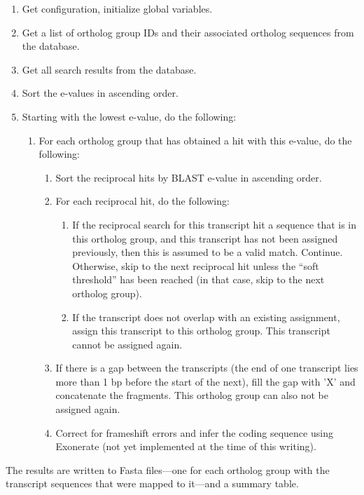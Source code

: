 \begin{enumerate}
	\item Get configuration, initialize global variables.
	\item Get a list of ortholog group IDs and their associated ortholog sequences
		from the database.
	\item Get all search results from the database.
	\item Sort the  e-values in ascending order.
	\item Starting with the lowest  e-value, do the following:
	\begin{enumerate}
		\item For each ortholog group that has obtained a  hit with this
			e-value, do the following:
			\begin{enumerate}
				\item Sort the reciprocal hits by BLAST e-value in ascending order.
				\item For each reciprocal hit, do the following:
				\begin{enumerate}
					\item If the reciprocal search for this transcript hit a sequence that
						is in this ortholog group, and this transcript has not been assigned
						previously, then this is assumed to be a valid match. Continue.
						Otherwise, skip to the next reciprocal hit unless the ``soft
						threshold'' has been reached (in that case, skip to the next
						ortholog group).
					\item If the transcript does not overlap with an existing assignment,
						assign this transcript to this ortholog group. This transcript cannot
						be assigned again. 
				\end{enumerate}
			\item If there is a gap between the transcripts (the end of one transcript
				lies more than 1 bp before the start of the next), fill the gap with
				'X' and concatenate the fragments. This ortholog group can also not be
				assigned again.
			\item Correct for frameshift errors and infer the coding sequence using
				Exonerate (not yet implemented at the time of this writing).
		\end{enumerate}
	\end{enumerate}
\end{enumerate}



The results are written to Fasta files---one for each ortholog group with the
transcript sequences that were mapped to it---and a summary table. 
